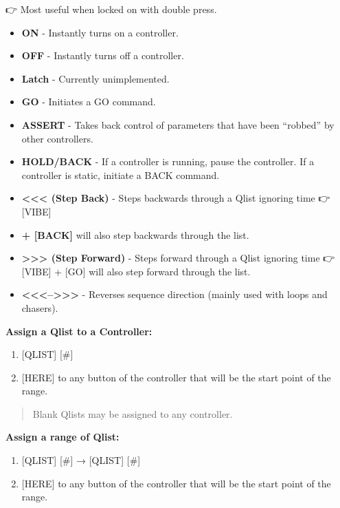 \documentclass[
]{article}
\begin{document}
👉 Most useful when locked on with double press.

\begin{itemize}
\item
  \textbf{ON} - Instantly turns on a controller.
\item
  \textbf{OFF} - Instantly turns off a controller.
\item
  {\textbf{Latch} - Currently unimplemented.}
\item
  \textbf{GO} - Initiates a GO command.
\item
  \textbf{ASSERT} - Takes back control of parameters that have been ``robbed'' by other controllers.
\item
  \textbf{HOLD/BACK} - If a controller is running, pause the controller. If a controller is static, initiate a BACK command.
\item
  \textbf{\textless\textless\textless{} (Step Back)} - Steps backwards through a Qlist ignoring time 👉 {[}VIBE{]}
\item
  \textbf{+ {[}BACK{]}} will also step backwards through the list.
\item
  \textbf{\textgreater\textgreater\textgreater{} (Step Forward)} - Steps forward through a Qlist ignoring time 👉 {[}VIBE{]} + {[}GO{]} will also step forward through the list.
\item
  \textbf{\textless\textless\textless--\textgreater\textgreater\textgreater{}} - Reverses sequence direction (mainly used with loops and chasers).
\end{itemize}

\textbf{Assign a Qlist to a Controller:}

\begin{enumerate}
\def\labelenumi{\arabic{enumi}.}
\item
  {[}QLIST{]} {[}\#{]}
\item
  {[}HERE{]} to any button of the controller that will be the start point of the range.
\end{enumerate}

\begin{quote}
Blank Qlists may be assigned to any controller.
\end{quote}

\textbf{Assign a range of Qlist:}

\begin{enumerate}
\def\labelenumi{\arabic{enumi}.}
\item
  {[}QLIST{]} {[}\#{]} → {[}QLIST{]} {[}\#{]}
\item
  {[}HERE{]} to any button of the controller that will be the start point of the range.
\end{enumerate}
\end{document}
